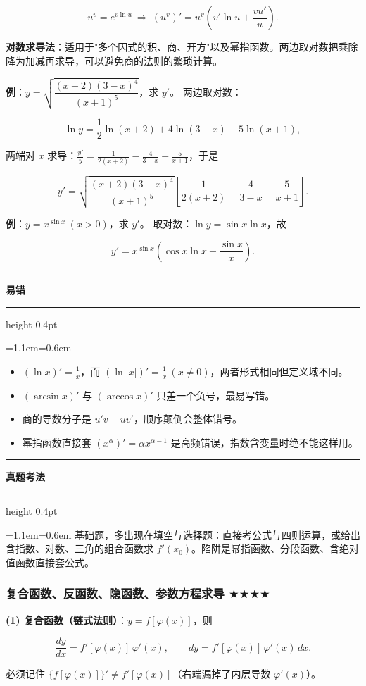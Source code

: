 \documentclass[11pt,openany,UTF8]{ctexbook}
\newcommand{\callouthead}[2]{%
  \par\addvspace{7pt}\noindent
  {\color{#1}\rule[-0.15em]{3pt}{1.05em}}\hspace{0.5em}%
  {\bfseries\color{#1}#2}\par\nobreak\vspace{-0.35em}%
  {\color{rulesep}\hrule height 0.4pt}\nobreak\vspace{0.45em}%
  \begingroup\small\setlength{\parindent}{0pt}%
  \leftskip=1.1em\rightskip=0.6em\noindent\ignorespaces}
\newcommand{\calloutend}{\par\endgroup\addvspace{7pt}}
\newenvironment{callwarn}[1]{\callouthead{warnbar}{#1}}{\calloutend}
\newenvironment{callexam}[1]{\callouthead{exambar}{#1}}{\calloutend}
\begin{document}
\[u^v=e^{v\ln u}\ \Longrightarrow\ (u^v)'=u^v\left(v'\ln u+\frac{vu'}{u}\right).\]

\textbf{对数求导法}：适用于"多个因式的积、商、开方"以及幂指函数。两边取对数把乘除降为加减再求导，可以避免商的法则的繁琐计算。

\textbf{例}：$y=\sqrt{\dfrac{(x+2)(3-x)^4}{(x+1)^5}}$，求 $y'$。 两边取对数：

\[\ln y=\frac12\ln(x+2)+4\ln(3-x)-5\ln(x+1),\]

两端对 $x$ 求导：$\frac{y'}{y}=\frac{1}{2(x+2)}-\frac{4}{3-x}-\frac{5}{x+1}$，于是

\[y'=\sqrt{\frac{(x+2)(3-x)^4}{(x+1)^5}}\left[\frac{1}{2(x+2)}-\frac{4}{3-x}-\frac{5}{x+1}\right].\]

\textbf{例}：$y=x^{\sin x}\ (x>0)$，求 $y'$。 取对数：$\ln y=\sin x\ln x$，故

\[y'=x^{\sin x}\left(\cos x\ln x+\frac{\sin x}{x}\right).\]

\begin{callwarn}{易错}
\begin{itemize}
\item $(\ln x)'=\frac1x$，而 $(\ln|x|)'=\frac1x\ (x\ne0)$，两者形式相同但定义域不同。
\item $(\arcsin x)'$ 与 $(\arccos x)'$ 只差一个负号，最易写错。
\item 商的导数分子是 $u'v-uv'$，顺序颠倒会整体错号。
\item 幂指函数直接套 $(x^\alpha)'=\alpha x^{\alpha-1}$ 是高频错误，指数含变量时绝不能这样用。
\end{itemize}
\end{callwarn}

\begin{callexam}{真题考法}
基础题，多出现在填空与选择题：直接考公式与四则运算，或给出含指数、对数、三角的组合函数求 $f'(x_0)$。陷阱是幂指函数、分段函数、含绝对值函数直接套公式。

\end{callexam}

\subsubsection{复合函数、反函数、隐函数、参数方程求导 $\bigstar$$\bigstar$$\bigstar$$\bigstar$}

\textbf{(1) 复合函数（链式法则）}：$y=f[\varphi(x)]$，则

\[\frac{dy}{dx}=f'[\varphi(x)]\,\varphi'(x),\qquad dy=f'[\varphi(x)]\,\varphi'(x)\,dx.\]

必须记住 $\{f[\varphi(x)]\}'\ne f'[\varphi(x)]$（右端漏掉了内层导数 $\varphi'(x)$）。
\end{document}
